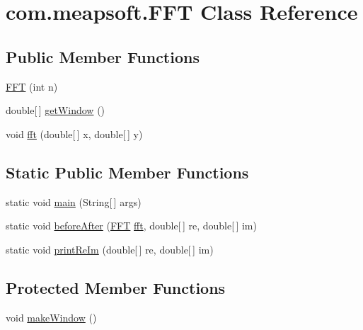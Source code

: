 \hypertarget{classcom_1_1meapsoft_1_1_f_f_t}{\section{com.\-meapsoft.\-F\-F\-T Class Reference}
\label{classcom_1_1meapsoft_1_1_f_f_t}
}
\subsection*{Public Member Functions}
\begin{DoxyCompactItemize}
\item 
\hyperlink{classcom_1_1meapsoft_1_1_f_f_t_a990170267a60d2b3aba84f70e8e5c7ea}{F\-F\-T} (int n)
\item 
double\mbox{[}$\,$\mbox{]} \hyperlink{classcom_1_1meapsoft_1_1_f_f_t_af413c29bd2357219bca424f2a05b12bf}{get\-Window} ()
\item 
void \hyperlink{classcom_1_1meapsoft_1_1_f_f_t_ad4197195f12f8a8c9456bfd35d0af744}{fft} (double\mbox{[}$\,$\mbox{]} x, double\mbox{[}$\,$\mbox{]} y)
\end{DoxyCompactItemize}
\subsection*{Static Public Member Functions}
\begin{DoxyCompactItemize}
\item 
static void \hyperlink{classcom_1_1meapsoft_1_1_f_f_t_a8374dbd7d10762b2d9e32f34249446fe}{main} (String\mbox{[}$\,$\mbox{]} args)
\item 
static void \hyperlink{classcom_1_1meapsoft_1_1_f_f_t_abf0df97b1b2f4fcbed8e02df90a7ea8d}{before\-After} (\hyperlink{classcom_1_1meapsoft_1_1_f_f_t}{F\-F\-T} \hyperlink{classcom_1_1meapsoft_1_1_f_f_t_ad4197195f12f8a8c9456bfd35d0af744}{fft}, double\mbox{[}$\,$\mbox{]} re, double\mbox{[}$\,$\mbox{]} im)
\item 
static void \hyperlink{classcom_1_1meapsoft_1_1_f_f_t_a030c9ef36f9c9aed438c5197e2ef1b93}{print\-Re\-Im} (double\mbox{[}$\,$\mbox{]} re, double\mbox{[}$\,$\mbox{]} im)
\end{DoxyCompactItemize}
\subsection*{Protected Member Functions}
\begin{DoxyCompactItemize}
\item 
void \hyperlink{classcom_1_1meapsoft_1_1_f_f_t_abfb8f38b88da0663d12abe3106df1514}{make\-Window} ()
\end{DoxyCompactItemize}


